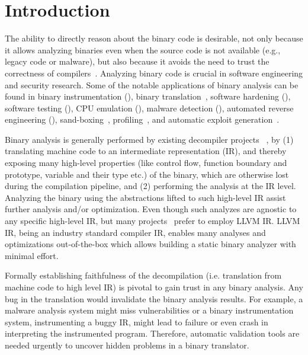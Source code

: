 \section{Introduction}
\label{sec:Intro}

The ability to directly reason about the binary code is desirable, not only because it allows analyzing binaries even when the source code is not available (e.g., legacy code or malware), but also because it avoids the need to trust the correctness of compilers~\cite{Thompson,WYSINWYE}.
Analyzing binary code is crucial in software engineering and security research.
Some of the notable applications of binary analysis can be found in binary
instrumentation
(\cite{Bruening:CGO2003,PEBIL10,Pin:2005,Valgrind:ENTCS03,DynamoRIO:2004}),
binary translation~\cite{UQBT:2000}, software hardening
(\cite{Cha:2015,Ford:2008,Zhang,Zhang:2013}), software testing
(\cite{Chipounov:2011,Avgerinos:2014,godefroid_automated_2008}), CPU
emulation (\cite{QEMU:USENIX05,Magnusson:2002}), malware detection
(\cite{Christodorescu:2005,Kruegel:2004,BitBlaze:2008,BAP:CAV11,Egele:USENIX07,Yin:CCS07}),
automated reverse engineering
(\cite{Cui:2008,Lin:2008,Schwartz:2013,Yakdan2015NDSS,McSema:Recon14,Angr,Radare2}),
sand-boxing~\cite{Kiriansky:2002:SEV,Erlingsson:2006,Yee:2009},
profiling~\cite{Harris:2005,Srivastava:1994}, and automatic exploit
generation~\cite{Cha:2012}.

Binary analysis is generally performed by existing decompiler projects
~\cite{McSema:Recon14,Remill,Angr1,BAP:CAV11,Radare2}, by (1) translating
machine code to an intermediate representation (IR), and thereby exposing many
high-level properties (like control flow, function boundary and prototype,
variable and their type etc.) of the binary, which are otherwise lost
during the compilation pipeline, and (2) performing the analysis at the IR
level.  Analyzing the binary using the abstractions lifted to such high-level
IR assist further analysis and/or optimization. Even though such analyzes are
agnostic to any specific high-level IR, but many
projects~\cite{McSema:Recon14,Remill,FCD,reopt,llvm-mctoll} prefer to employ
LLVM IR. LLVM IR, being an industry standard compiler IR, enables many analyses
and optimizations out-of-the-box which allows building a static binary analyzer
with minimal effort.


Formally establishing faithfulness of the
decompilation (i.e. translation from machine code to high level IR) is pivotal to gain trust
in any binary analysis. Any bug in the translation would invalidate the binary analysis
results. For example, a malware analysis system might miss vulnerabilities or a binary
instrumentation system, instrumenting a buggy IR, might lead to failure or even crash in
interpreting the instrumented program. Therefore, automatic validation tools are needed
urgently to uncover hidden problems in a binary translator.

